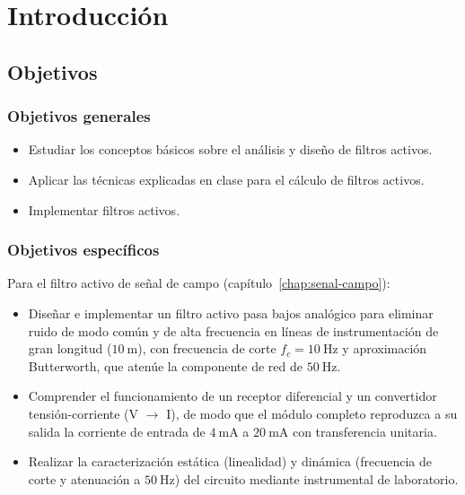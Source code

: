 \chapter{Introducción}
\label{chap:introduccion}

\section{Objetivos}
\label{sec:objetivos}

\subsection{Objetivos generales}
\label{subsec:objetivos-generales}

\begin{itemize}
  \item Estudiar los conceptos básicos sobre el análisis y diseño de filtros activos.
  \item Aplicar las técnicas explicadas en clase para el cálculo de filtros activos.
  \item Implementar filtros activos.
\end{itemize}

\subsection{Objetivos específicos}
\label{subsec:objetivos-especificos}

Para el filtro activo de señal de campo (capítulo~\ref{chap:senal-campo}):
\begin{itemize}
  \item Diseñar e implementar un filtro activo pasa bajos analógico para eliminar ruido de modo común y de alta
    frecuencia en líneas de instrumentación de gran longitud ($\SI{10}{\metre}$), con frecuencia de corte
    $f_c = \SI{10}{\hertz}$ y aproximación Butterworth, que atenúe la componente de red de $\SI{50}{\hertz}$.
  \item Comprender el funcionamiento de un receptor diferencial y un convertidor tensión-corriente (V $\rightarrow$ I),
    de modo que el módulo completo reproduzca a su salida la corriente de entrada de $\SI{4}{\milli\ampere}$ a
    $\SI{20}{\milli\ampere}$ con transferencia unitaria.
  \item Realizar la caracterización estática (linealidad) y dinámica (frecuencia de corte y atenuación a
    $\SI{50}{\hertz}$) del circuito mediante instrumental de laboratorio.
\end{itemize}

